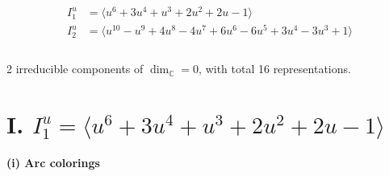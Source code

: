 \documentclass[1p]{elsarticle_modified}
\theoremstyle{definition}
\begin{document}
\begin{align*}
I^u_{1}&=\langle 
u^6+3 u^4+u^3+2 u^2+2 u-1\rangle \\
I^u_{2}&=\langle 
u^{10}- u^9+4 u^8-4 u^7+6 u^6-6 u^5+3 u^4-3 u^3+1\rangle \\
\\
\end{align*}
\raggedright * 2 irreducible components of $\dim_{\mathbb{C}}=0$, with total 16 representations.\\
\newpage
\renewcommand{\arraystretch}{1}
\centering \section*{I. $I^u_{1}= \langle u^6+3 u^4+u^3+2 u^2+2 u-1 \rangle$}
\flushleft \textbf{(i) Arc colorings}\\
\end{document}
